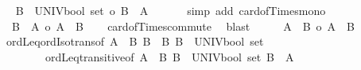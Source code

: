 \begin{isabellebody}
\ \isamarkupfalse%
\ {\isachardoublequoteopen}{\isacharbar}{\kern0pt}B\ {\isasymtimes}\ {\isacharparenleft}{\kern0pt}UNIV{\isacharcolon}{\kern0pt}{\isacharcolon}{\kern0pt}bool\ set{\isacharparenright}{\kern0pt}{\isacharbar}{\kern0pt}\ {\isasymle}o\ {\isacharbar}{\kern0pt}B\ {\isasymtimes}\ A{\isacharbar}{\kern0pt}{\isachardoublequoteclose}\isanewline
\ \ \isamarkupfalse%
\ {}\ \isamarkupfalse%
\ {\isacharparenleft}{\kern0pt}simp\ add{\isacharcolon}{\kern0pt}\ card{\isacharunderscore}{\kern0pt}of{\isacharunderscore}{\kern0pt}Times{\isacharunderscore}{\kern0pt}mono{}{\isacharparenright}{\kern0pt}\isanewline
\ \ \isamarkupfalse%
\ \isamarkupfalse%
\ {\isachardoublequoteopen}\ {\isacharbar}{\kern0pt}B\ {\isasymtimes}\ A{\isacharbar}{\kern0pt}\ {\isacharequal}{\kern0pt}o\ {\isacharbar}{\kern0pt}A\ {\isasymtimes}\ B{\isacharbar}{\kern0pt}{\isachardoublequoteclose}\isanewline
\ \ \isamarkupfalse%
\ card{\isacharunderscore}{\kern0pt}of{\isacharunderscore}{\kern0pt}Times{\isacharunderscore}{\kern0pt}commute\ \isamarkupfalse%
\ blast\isanewline
\ \ \isamarkupfalse%
\ \isamarkupfalse%
\ {\isachardoublequoteopen}{\isacharbar}{\kern0pt}A\ {\isacharless}{\kern0pt}{\isacharplus}{\kern0pt}{\isachargreater}{\kern0pt}\ B{\isacharbar}{\kern0pt}\ {\isasymle}o\ {\isacharbar}{\kern0pt}A\ {\isasymtimes}\ B{\isacharbar}{\kern0pt}{\isachardoublequoteclose}\isanewline
\ \ \isamarkupfalse%
\ ordLeq{\isacharunderscore}{\kern0pt}ordIso{\isacharunderscore}{\kern0pt}trans{\isacharbrackleft}{\kern0pt}of\ {\isachardoublequoteopen}{\isacharbar}{\kern0pt}A\ {\isacharless}{\kern0pt}{\isacharplus}{\kern0pt}{\isachargreater}{\kern0pt}\ B{\isacharbar}{\kern0pt}{\isachardoublequoteclose}\ {\isachardoublequoteopen}{\isacharbar}{\kern0pt}B\ {\isacharless}{\kern0pt}{\isacharplus}{\kern0pt}{\isachargreater}{\kern0pt}\ B{\isacharbar}{\kern0pt}{\isachardoublequoteclose}\ {\isachardoublequoteopen}{\isacharbar}{\kern0pt}B\ {\isasymtimes}\ {\isacharparenleft}{\kern0pt}UNIV{\isacharcolon}{\kern0pt}{\isacharcolon}{\kern0pt}bool\ set{\isacharparenright}{\kern0pt}{\isacharbar}{\kern0pt}{\isachardoublequoteclose}{\isacharbrackright}{\kern0pt}\isanewline
\ \ \ \ \ \ \ \ ordLeq{\isacharunderscore}{\kern0pt}transitive{\isacharbrackleft}{\kern0pt}of\ {\isachardoublequoteopen}{\isacharbar}{\kern0pt}A\ {\isacharless}{\kern0pt}{\isacharplus}{\kern0pt}{\isachargreater}{\kern0pt}\ B{\isacharbar}{\kern0pt}{\isachardoublequoteclose}\ {\isachardoublequoteopen}{\isacharbar}{\kern0pt}B\ {\isasymtimes}\ {\isacharparenleft}{\kern0pt}UNIV{\isacharcolon}{\kern0pt}{\isacharcolon}{\kern0pt}bool\ set{\isacharparenright}{\kern0pt}{\isacharbar}{\kern0pt}{\isachardoublequoteclose}\ {\isachardoublequoteopen}{\isacharbar}{\kern0pt}B\ {\isasymtimes}\ A{\isacharbar}{\kern0pt}{\isachardoublequoteclose}{\isacharbrackright}{\kern0pt}\isanewline

\end{isabellebody}
